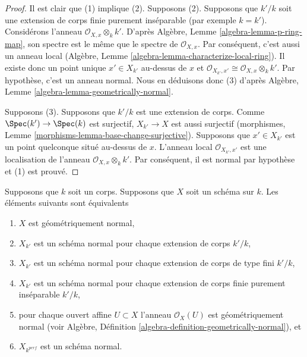 \begin{proof}
Il est clair que (1) implique (2). Supposons (2).
Supposons que $k'/k$ soit une extension de corps finie
purement inséparable (par exemple $k = k'$). Considérons
l'anneau $\mathcal{O}_{X, x} \otimes_k k'$. D'après
Algèbre, Lemme \ref{algebra-lemma-p-ring-map}, son spectre
est le même que le spectre de $\mathcal{O}_{X, x}$. Par
conséquent, c'est aussi un anneau local (Algèbre, Lemme
\ref{algebra-lemma-characterize-local-ring}). Il existe donc
un point unique $x' \in X_{k'}$ au-dessus de $x$ et
$\mathcal{O}_{X_{k'}, x'} \cong \mathcal{O}_{X, x} \otimes_k k'$.
Par hypothèse, c'est un anneau normal. Nous en déduisons donc (3)
d'après Algèbre, Lemme \ref{algebra-lemma-geometrically-normal}.

\medskip\noindent
Supposons (3). Supposons que $k'/k$ est une extension de
corps. Comme $\Spec(k') \to \Spec(k)$ est surjectif,
$X_{k'} \to X$ est aussi surjectif (morphismes, Lemme
\ref{morphisms-lemma-base-change-surjective}). Supposons
que $x' \in X_{k'}$ est un point quelconque situé au-dessus
de $x$. L'anneau local $\mathcal{O}_{X_{k'}, x'}$ est une
localisation de l'anneau $\mathcal{O}_{X, x} \otimes_k k'$.
Par conséquent, il est normal par hypothèse et (1) est prouvé.
\end{proof}

\begin{lemma}
\label{lemma-geometrically-normal}
Supposons que $k$ soit un corps.
Supposons que $X$ soit un schéma sur
$k$. Les éléments suivants sont équivalents
\begin{enumerate}
\item $X$ est géométriquement normal, \item $X_{k'}$
est un schéma normal pour chaque extension de corps
$k'/k$, \item $X_{k'}$ est un schéma normal pour
chaque extension de corps de type fini $k'/k$, \item
$X_{k'}$ est un schéma normal pour chaque extension
de corps finie purement inséparable $k'/k$, \item
pour chaque ouvert affine $U \subset X$ l'anneau
$\mathcal{O}_X(U)$ est géométriquement normal (voir
Algèbre, Définition
\ref{algebra-definition-geometrically-normal}), et \item $X_{k^{perf}}$ est un schéma normal.
\end{enumerate}
\end{lemma}

